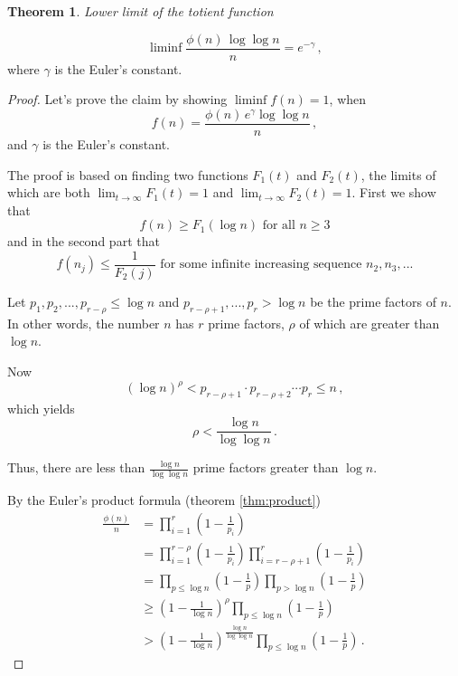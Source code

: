 \documentclass{article}
\theoremstyle{definition}
\newtheorem{theorem}[subsubsection]{Theorem}
\begin{document}
\begin{theorem}{\emph{Lower limit of the totient function}}

\begin{equation*}
    \liminf{\frac{\phi(n)\,\log\log n}{n}}=e^{-\gamma}\,,
\end{equation*}
where $\gamma$ is the Euler's constant.

\begin{proof}

Let's prove the claim by showing $\liminf{f(n)} = 1$, when
\begin{equation*}
    f(n)= \frac{\phi(n)\,e^\gamma \log\log n}{n}\,,
\end{equation*}
and $\gamma$ is the Euler's constant.

The proof is based on finding two functions $F_1(t)$ and $F_2(t)$, the limits of which are both $\lim_{t\rightarrow \infty} F_1(t) = 1$ and $\lim_{t\rightarrow \infty} F_2(t) = 1$. First we show that 
\begin{equation}
\label{eq:first}
    f(n) \geq F_1(\log n)\text{ for all }n\geq 3
\end{equation}
and in the second part that
\begin{equation}
\label{eq:second}
    f(n_j) \leq \frac{1}{F_2(j)}\text{ for some infinite increasing sequence }n_2, n_3,...
\end{equation}

Let $p_1,p_2,...,p_{r-\rho} \leq \log n$ and $p_{r-\rho+1},...,p_r > \log n$ be the prime factors of $n$. In other words, the number $n$ has $r$ prime factors, $\rho$ of which are greater than $\log n$.

Now
\begin{equation*}
    (\log n)^\rho < p_{r-\rho+1} \cdot p_{r-\rho+2} \cdots p_r \leq n\,,
\end{equation*}
which yields
\begin{equation*}
    \rho < \frac{\log n}{\log\log n}\,.
\end{equation*}

Thus, there are less than $\frac{\log n}{\log\log n}$ prime factors greater than $\log n$.

By the Euler's product formula (theorem \ref{thm:product})
\begin{align*}
    \frac{\phi(n)}{n} & = \prod_{i=1}^r\left(1-\frac{1}{p_i}\right)\\
    & = \prod_{i=1}^{r-\rho}\left(1-\frac{1}{p_i}\right) \prod_{i=r-\rho+1}^r\left(1-\frac{1}{p_i}\right)\\
    & = \prod_{p\leq\log n}\left(1-\frac{1}{p}\right) \prod_{p>\log n}\left(1-\frac{1}{p}\right)\\
    & \geq \left(1-\frac{1}{\log n}\right)^\rho \prod_{p\leq\log n}\left(1-\frac{1}{p}\right) \\
    & > \left(1-\frac{1}{\log n}\right)^\frac{\log n}{\log \log n} \prod_{p\leq\log n}\left(1-\frac{1}{p}\right)\,.
\end{align*}


\end{proof}
\end{theorem}
\end{document}
